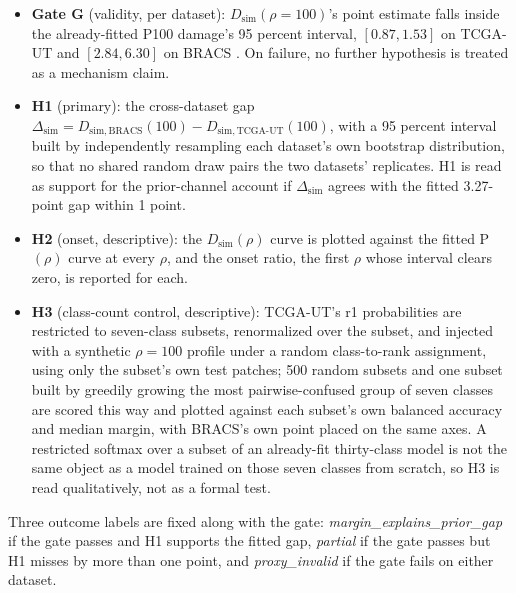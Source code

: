 \documentclass[11pt]{article}
\begin{document}
\begin{itemize}
  \item \textbf{Gate G} (validity, per dataset): $D_{\mathrm{sim}}(\rho=100)$'s point estimate falls inside the already-fitted P100 damage's 95 percent interval, $[0.87, 1.53]$ on TCGA-UT and $[2.84, 6.30]$ on BRACS \citep{queisler2026causeTcga, queisler2026causeBracs}. On failure, no further hypothesis is treated as a mechanism claim.
  \item \textbf{H1} (primary): the cross-dataset gap $\Delta_{\mathrm{sim}} = D_{\mathrm{sim,BRACS}}(100) - D_{\mathrm{sim,TCGA\text{-}UT}}(100)$, with a 95 percent interval built by independently resampling each dataset's own bootstrap distribution, so that no shared random draw pairs the two datasets' replicates. H1 is read as support for the prior-channel account if $\Delta_{\mathrm{sim}}$ agrees with the fitted 3.27-point gap within 1 point.
  \item \textbf{H2} (onset, descriptive): the $D_{\mathrm{sim}}(\rho)$ curve is plotted against the fitted P$(\rho)$ curve at every $\rho$, and the onset ratio, the first $\rho$ whose interval clears zero, is reported for each.
  \item \textbf{H3} (class-count control, descriptive): TCGA-UT's r1 probabilities are restricted to seven-class subsets, renormalized over the subset, and injected with a synthetic $\rho=100$ profile under a random class-to-rank assignment, using only the subset's own test patches; 500 random subsets and one subset built by greedily growing the most pairwise-confused group of seven classes are scored this way and plotted against each subset's own balanced accuracy and median margin, with BRACS's own point placed on the same axes. A restricted softmax over a subset of an already-fit thirty-class model is not the same object as a model trained on those seven classes from scratch, so H3 is read qualitatively, not as a formal test.
\end{itemize}

\noindent Three outcome labels are fixed along with the gate: \emph{margin\_explains\_prior\_gap} if the gate passes and H1 supports the fitted gap, \emph{partial} if the gate passes but H1 misses by more than one point, and \emph{proxy\_invalid} if the gate fails on either dataset.





\end{document}
